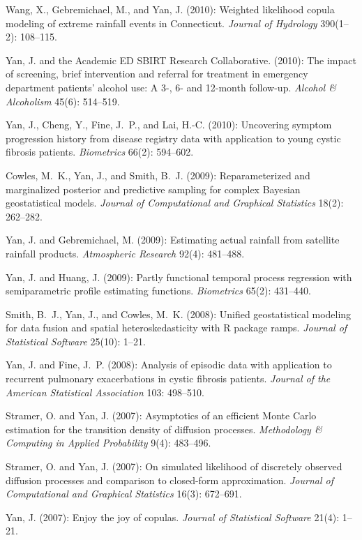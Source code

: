 \documentclass[Statistics]{vita}
\begin{document}
\begin{vita}
\begin{Publications}
\begin{RefereedJournalArticles}
  \item *Wang, X., Gebremichael, M., and Yan, J. (2010): Weighted likelihood copula modeling of extreme rainfall events in Connecticut. {\em Journal of Hydrology\/} 390(1--2): 108--115.
  \item Yan, J. and the Academic ED SBIRT Research Collaborative. (2010): The impact of screening, brief intervention and referral for treatment in emergency department patients' alcohol use: A 3-, 6- and 12-month follow-up. {\em Alcohol \& Alcoholism\/} 45(6): 514--519.
  \item Yan, J., Cheng, Y., Fine, J.~P., and Lai, H.-C. (2010): Uncovering symptom progression history from disease registry data with application to young cystic fibrosis patients. {\em Biometrics\/} 66(2): 594--602.
  \item Cowles, M.~K., Yan, J., and Smith, B.~J. (2009): Reparameterized and marginalized posterior and predictive sampling for complex Bayesian geostatistical models. {\em Journal of Computational and Graphical Statistics\/} 18(2): 262--282.
  \item Yan, J. and Gebremichael, M. (2009): Estimating actual rainfall from satellite rainfall products. {\em Atmospheric Research\/} 92(4): 481--488.
  \item Yan, J. and Huang, J. (2009): Partly functional temporal process regression with semiparametric profile estimating functions. {\em Biometrics\/} 65(2): 431--440.
  \item Smith, B.~J., Yan, J., and Cowles, M.~K. (2008): Unified geostatistical modeling for data fusion and spatial heteroskedasticity with R package ramps. {\em Journal of Statistical Software\/} 25(10): 1--21.
  \item Yan, J. and Fine, J.~P. (2008): Analysis of episodic data with application to recurrent pulmonary exacerbations in cystic fibrosis patients. {\em Journal of the American Statistical Association\/}  103: 498--510.
  \item Stramer, O. and Yan, J. (2007): Asymptotics of an efficient {M}onte {C}arlo estimation for the transition density of diffusion processes. {\em Methodology \& Computing in Applied Probability\/} 9(4): 483--496.
  \item Stramer, O. and Yan, J. (2007): On simulated likelihood of discretely observed diffusion processes and comparison to closed-form approximation. {\em Journal of Computational and Graphical Statistics\/} 16(3): 672--691.
  \item Yan, J. (2007): Enjoy the joy of copulas. {\em Journal of Statistical Software\/} 21(4): 1--21.

\end{RefereedJournalArticles}
\end{Publications}
\end{vita}
\end{document}
